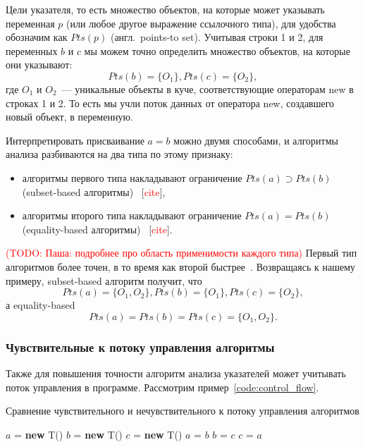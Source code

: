 \documentclass[14pt,titlepage]{extarticle}
\newcommand{\NEW}{\textbf{new }}
\newcommand{\todo}[1]{\textcolor{red}{(\eng{TODO}: #1)}}
\newcommand{\todocite}{[\textcolor{red}{\eng{cite}}]}
\newcommand{\eng}[1]{{\English#1}}
\newcommand{\engdef}[1]{(англ.~\eng{#1})}
\begin{document}
        Цели указателя, то есть множество объектов, на которые может указывать
        переменная $p$ (или любое другое выражение ссылочного типа), для
        удобства обозначим как $Pts(p)$ \engdef{points-to set}.
        Учитывая строки 1 и 2, для переменных $b$ и $c$ мы можем точно
        определить множество объектов, на которые они указывают:
        \[Pts(b) = \{O_1\}, Pts(c) = \{O_2\},\]
        где $O_1$ и $O_2$~--- уникальные объекты в куче, соответствующие
        операторам \eng{new} в строках 1 и 2.  То есть мы учли поток данных от
        оператора \eng{new}, создавшего новый объект, в переменную.

        Интерпретировать присваивание $a = b$ можно двумя способами,
        и алгоритмы анализа разбиваются на два типа по этому признаку:
        \begin{itemize}
          \item алгоритмы первого типа накладывают ограничение
                $Pts(a) \supset Pts(b)$
                (\eng{subset-based} алгоритмы)~\cite{rayside_overview}
                \todocite,
          \item алгоритмы второго типа накладывают ограничение
                $Pts(a) = Pts(b)$
                (\eng{equality-based} алгоритмы)~\cite{rayside_overview}
                \todocite.
        \end{itemize}
        \todo{Паша: подробнее про область применимости каждого типа}
        Первый тип алгоритмов более точен, в то время как второй
        быстрее~\cite{steensgaard}. Возвращаясь к нашему примеру,
        \eng{subset-based} алгоритм получит, что
        \[Pts(a) = \{O_1, O_2\}, Pts(b) = \{O_1\}, Pts(c) = \{O_2\},\]
        а \eng{equality-based}
        \[Pts(a) = Pts(b) = Pts(c) = \{O_1, O_2\}.\]

      \subsubsection{Чувствительные к потоку управления алгоритмы}
        \label{section:analysis_classification_control_flow}

        Также для повышения точности алгоритм анализа указателей может
        учитывать поток управления в программе.
        Рассмотрим пример~\ref{code:control_flow}.
        \begin{algorithm}
          \caption{Сравнение чувствительного и нечувствительного к потоку
                   управления алгоритмов}
          \label{code:control_flow}
          \begin{algorithmic}[1]
            \STATE $a$ = \NEW T()
            \STATE $b$ = \NEW T()
            \STATE $c$ = \NEW T()
            \STATE $a$ = $b$
            \STATE $b$ = $c$
            \STATE $c$ = $a$
          \end{algorithmic}
        \end{algorithm}
\end{document}
